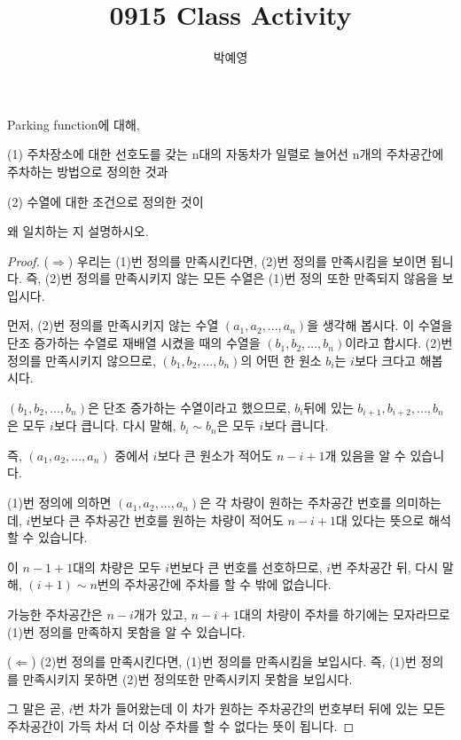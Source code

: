 \documentclass[a4paper, 12pt]{article}
\title{0915 Class Activity}
\author{박예영}
\begin{document}
\maketitle
\begin{mdframed}

Parking function에 대해, 

(1) 주차장소에 대한 선호도를 갖는 n대의 자동차가 일렬로 늘어선 n개의 주차공간에 주차하는 방법으로 정의한 것과

(2) 수열에 대한 조건으로 정의한 것이

왜 일치하는 지 설명하시오.

\end{mdframed}
\doublespacing

\begin{proof}


($\Rightarrow$)
우리는 (1)번 정의를 만족시킨다면, (2)번 정의를 만족시킴을 보이면 됩니다. 즉, (2)번 정의를 만족시키지 않는 모든 수열은 (1)번 정의 또한 만족되지 않음을 보입시다.

먼저, (2)번 정의를 만족시키지 않는 수열 $(a_1, a_2, ... , a_n)$을 생각해 봅시다. 이 수열을 단조 증가하는 수열로 재배열 시켰을 때의 수열을 $(b_1, b_2, ... , b_n)$이라고 합시다. (2)번 정의를 만족시키지 않으므로, $(b_1, b_2, ..., b_n)$의 어떤 한 원소 $b_i$는 $i$보다 크다고 해봅시다.

$(b_1, b_2, ... , b_n)$은 단조 증가하는 수열이라고 했으므로, $b_i$뒤에 있는 $b_{i+1}, b_{i+2}, ... , b_n$은 모두 $i$보다 큽니다. 다시 말해, $b_i \sim b_n$은 모두 $i$보다 큽니다.

즉, $(a_1, a_2, ..., a_n)$ 중에서 $i$보다 큰 원소가 적어도 $n-i+1$개 있음을 알 수 있습니다.

(1)번 정의에 의하면 $(a_1, a_2, ... , a_n)$은 각 차량이 원하는 주차공간 번호를 의미하는데, $i$번보다 큰 주차공간 번호를 원하는 차량이 적어도 $n-i+1$대 있다는 뜻으로 해석할 수 있습니다.

이 $n-1+1$대의 차량은 모두 $i$번보다 큰 번호를 선호하므로, $i$번 주차공간 뒤, 다시 말해, $(i+1) \sim n$번의 주차공간에 주차를 할 수 밖에 없습니다.

가능한 주차공간은 $n-i$개가 있고, $n-i+1$대의 차량이 주차를 하기에는 모자라므로 (1)번 정의를 만족하지 못함을 알 수 있습니다.


($\Leftarrow$)
(2)번 정의를 만족시킨다면, (1)번 정의를 만족시킴을 보입시다. 즉, (1)번 정의를 만족시키지 못하면 (2)번 정의또한 만족시키지 못함을 보입시다.

그 말은 곧, $i$번 차가 들어왔는데 이 차가 원하는 주차공간의 번호부터 뒤에 있는 모든 주차공간이 가득 차서 더 이상 주차를 할 수 없다는 뜻이 됩니다.


\end{proof}
\end{document}

